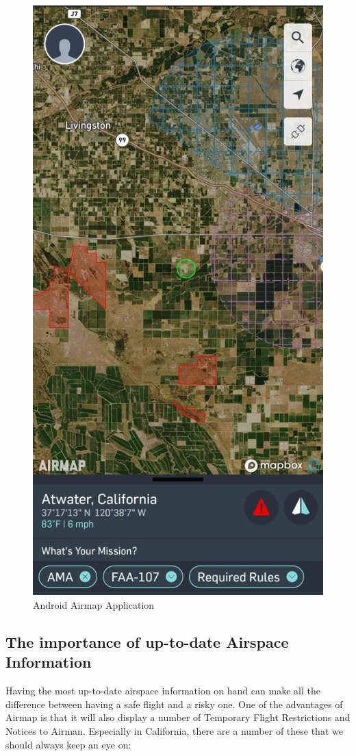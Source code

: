 \documentclass[
  12pt,
]{book}
\begin{document}
\begin{figure}

{\centering \includegraphics[width=0.5\linewidth]{images/Airmap-Android} 

}

\caption{Android Airmap Application}\label{fig:airmap}
\end{figure}

\hypertarget{the-importance-of-up-to-date-airspace-information}{%
\subsection{The importance of up-to-date Airspace Information}\label{the-importance-of-up-to-date-airspace-information}}

Having the most up-to-date airspace information on hand can make all the difference between having a safe flight and a risky one. One of the advantages of Airmap is that it will also display a number of Temporary Flight Restrictions and Notices to Airman. Especially in California, there are a number of these that we should always keep an eye on:
\end{document}
